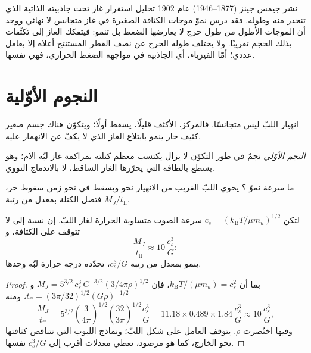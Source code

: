 \begin{history}
نشر جيمس جينز (1877--1946) عام 1902 تحليل استقرار
غاز تحت جاذبيته الذاتية الذي تنحدر منه  وطوله. فقد
درس نموّ موجات الكثافة الصغيرة في غاز متجانس لا نهائي
ووجد أن الموجات الأطول من طول حرج لا يعارضها الضغط
بل تنمو: فيتفكك الغاز إلى تكثّفات بذلك الحجم تقريبًا. ولا يختلف طوله
الحرج عن نصف القطر المستنتج أعلاه إلا بعامل عددي؛ أمّا
الفيزياء، أي الجاذبية في مواجهة الضغط الحراري، فهي نفسها.
\end{history}

\section{النجوم الأوّلية}

انهيار اللبّ ليس متجانسًا. فالمركز، الأكثف قليلًا، يسقط
أولًا؛ ويتكوّن هناك جسم صغير كثيف حار ينمو بابتلاع الغاز
الذي لا يكفّ عن الانهمار عليه.

\begin{definition}\label{def:b2:ism-star-formation:protostar}
\emph{النجم الأوّلي} نجمٌ في طور التكوّن لا يزال
يكتسب معظم كتلته بمراكمة غاز لبّه الأم؛ وهو
يسطع بالطاقة التي يحرّرها الغاز الساقط، لا بالاندماج النووي.
\end{definition}

ما سرعة نموّ ؟ يحوي اللبّ القريب من الانهيار نحو 
ويسقط في نحو زمن سقوط حر، فتصل الكتلة بمعدل من رتبة
$M_J/t_{\mathrm{ff}}$.

\begin{proposition}
\label{prop:b2:ism-star-formation:accretion}
لتكن $c_s = (k_{\mathrm B}T/\mu m_u)^{1/2}$ سرعة الصوت متساوية الحرارة
لغاز اللبّ. إن نسبة  إلى 
لا تتوقف على الكثافة، و
\[
  \frac{M_J}{t_{\mathrm{ff}}} \approx 10\,\frac{c_s^3}{G}:
\]
 ينمو بمعدل من رتبة $c_s^3/G$، تحدّده درجة حرارة
لبّه وحدها.
\end{proposition}

\begin{proof}
بما أن $k_{\mathrm B}T/(\mu m_u) = c_s^2$، فإن $M_J = 5^{3/2}\,c_s^3\,G^{-3/2}
(3/4\pi\rho)^{1/2}$ و$t_{\mathrm{ff}} = (3\pi/32)^{1/2}(G\rho)^{-1/2}$، ومنه
\[
  \frac{M_J}{t_{\mathrm{ff}}} = 5^{3/2}\left(\frac{3}{4\pi}\right)^{1/2}
  \left(\frac{32}{3\pi}\right)^{1/2}\frac{c_s^3}{G}
  = 11.18\times0.489\times1.84\,\frac{c_s^3}{G} \approx 10\,\frac{c_s^3}{G},
\]
وفيها اختُصرت $\rho$. يتوقف العامل على شكل اللبّ؛
ونماذج اللبوب التي تتناقص كثافتها نحو الخارج، كما هو مرصود، تعطي معدلات
أقرب إلى $c_s^3/G$ نفسها.
\end{proof}

